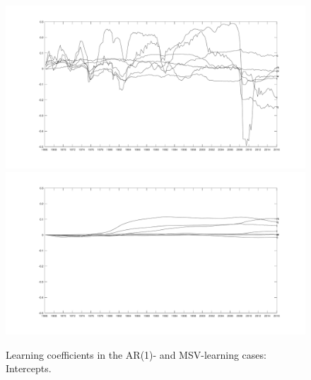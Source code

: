 \documentclass[12pt,reqno]{article}
\numberwithin{equation}{section}
\begin{document}
\begin{figure}[H]
\label{sw_learning_1}
\caption{Learning coefficients in the AR(1)- and MSV-learning cases: Intercepts.} 
\vspace{5 mm}

\includegraphics[scale=0.5]{sw_ar1_learning_alphas.pdf}\\
\includegraphics[scale=0.5]{sw_msv_learning_alphas.pdf}\\


\end{figure}
\end{document}
